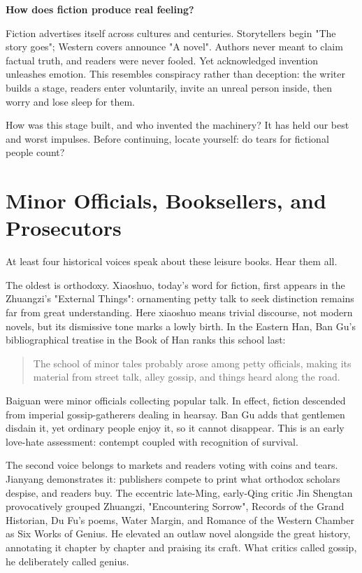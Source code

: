\textbf{How does fiction produce real feeling?}

Fiction advertises itself across cultures and centuries. Storytellers begin "The story goes"; Western covers announce "A novel". Authors never meant to claim factual truth, and readers were never fooled. Yet acknowledged invention unleashes emotion. This resembles conspiracy rather than deception: the writer builds a stage, readers enter voluntarily, invite an unreal person inside, then worry and lose sleep for them.

How was this stage built, and who invented the machinery? It has held our best and worst impulses. Before continuing, locate yourself: do tears for fictional people count?

\section[Officials, Booksellers, and Prosecutors]{Minor Officials, Booksellers, and Prosecutors}
At least four historical voices speak about these leisure books. Hear them all.

The oldest is orthodoxy. Xiaoshuo, today's word for fiction, first appears in the Zhuangzi's "External Things": ornamenting petty talk to seek distinction remains far from great understanding. Here xiaoshuo means trivial discourse, not modern novels, but its dismissive tone marks a lowly birth. In the Eastern Han, Ban Gu's bibliographical treatise in the Book of Han ranks this school last:

\begin{quote}
The school of minor tales probably arose among petty officials, making its material from street talk, alley gossip, and things heard along the road.
\end{quote}
Baiguan were minor officials collecting popular talk. In effect, fiction descended from imperial gossip-gatherers dealing in hearsay. Ban Gu adds that gentlemen disdain it, yet ordinary people enjoy it, so it cannot disappear. This is an early love-hate assessment: contempt coupled with recognition of survival.

The second voice belongs to markets and readers voting with coins and tears. Jianyang demonstrates it: publishers compete to print what orthodox scholars despise, and readers buy. The eccentric late-Ming, early-Qing critic Jin Shengtan provocatively grouped Zhuangzi, "Encountering Sorrow", Records of the Grand Historian, Du Fu's poems, Water Margin, and Romance of the Western Chamber as Six Works of Genius. He elevated an outlaw novel alongside the great history, annotating it chapter by chapter and praising its craft. What critics called gossip, he deliberately called genius.

